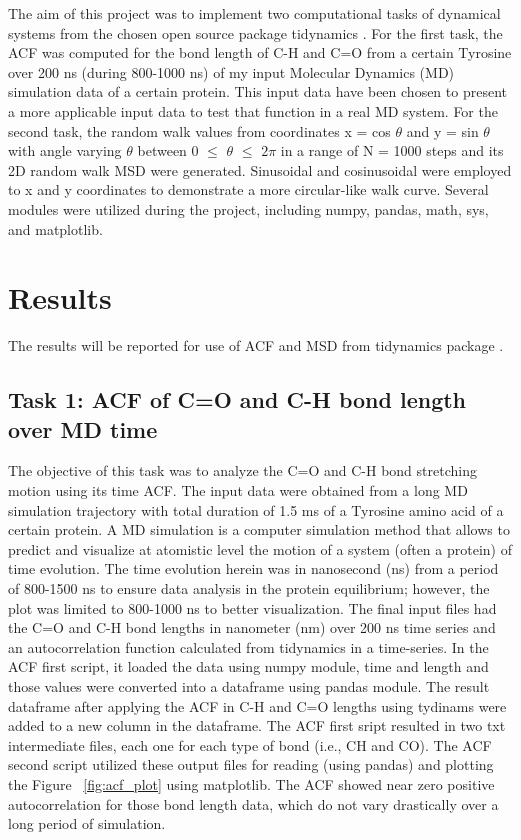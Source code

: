 \documentclass{article}
\begin{document}
The aim of this project was to implement two computational tasks of dynamical systems from the chosen open source package tidynamics \cite{Buyl2018}. For the first task, the ACF was computed for the bond length of C-H and C=O from a certain Tyrosine over 200 ns (during 800-1000 ns) of my input Molecular Dynamics (MD) simulation data of a certain protein. This input data have been chosen to present a more applicable input data to test that function in a real MD system. For the second task, the random walk values from coordinates x = cos $\theta$ and y = sin $\theta$ with angle varying $\theta$ between 0 $\leq$ $\theta$ $\leq$ $2\pi$ in a range of N = 1000 steps and its 2D random walk MSD were generated. Sinusoidal and cosinusoidal were employed to x and y coordinates to demonstrate a more circular-like walk curve. Several modules were utilized during the project, including numpy, pandas, math, sys, and matplotlib.

\section{Results}

The results will be reported for use of ACF and MSD from tidynamics package \cite{Buyl2018}.

\subsection{Task 1: ACF of C=O and C-H bond length over MD time}

The objective of this task was to analyze the C=O and C-H bond stretching motion using its time ACF. The input data were obtained from a long MD simulation trajectory with total duration of 1.5 ms of a Tyrosine amino acid of a certain protein. A MD simulation is a computer simulation method that allows to predict and visualize at atomistic level the motion of a system (often a protein) of time evolution. The time evolution herein was in nanosecond (ns) from a period of 800-1500 ns to ensure data analysis in the protein equilibrium; however, the plot was limited to 800-1000 ns to better visualization. The final input files had the C=O and C-H bond lengths in nanometer (nm) over 200 ns time series and an autocorrelation function calculated from tidynamics \cite{Buyl2018} in a time-series. In the ACF first script, it loaded the data using numpy module, time and length and those values were converted into a dataframe using pandas module. The result dataframe after applying the ACF in C-H and C=O lengths using tydinams were added to a new column in the dataframe. The ACF first sript resulted in two txt intermediate files, each one for each type of bond (i.e., CH and CO). The ACF second script utilized these output files for reading (using pandas) and plotting the Figure ~\ref{fig:acf_plot} using matplotlib. The ACF showed near zero positive autocorrelation for those bond length data, which do not vary drastically over a long period of simulation.
\end{document}
